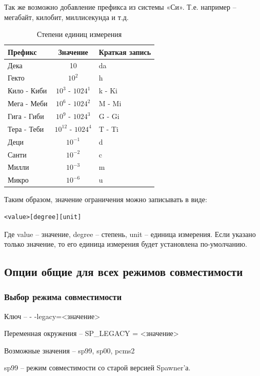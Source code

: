 \documentclass{imcs}
\begin{document}
Так же возможно добавление префикса из системы «Си». Т.е. например – мегабайт, килобит, миллисекунда и т.д.

\begin{table}[h!]
\begin{center}
\begin{tabular}{|l|c|l|}
\hline
Префикс & Значение &  Краткая запись\\
\hline
Дека &  10  & da\\
\hline
Гекто & $10^2$  & h\\
\hline
Кило - Киби & $10^3$ - $1024^1$ & k - Ki\\
\hline
Мега - Меби & $10^6$ - $1024^2$ & M - Mi\\
\hline
Гига - Гиби & $10^9$ - $1024^3$ & G - Gi\\
\hline
Тера - Теби & $10^{12}$ - $1024^4$  & T - Ti\\
\hline
Деци  & $10^{-1}$ & d\\
\hline
Санти & $10^{-2}$ & c\\
\hline
Милли & $10^{-3}$ & m\\
\hline
Микро & $10^{-6}$ & u\\
\hline
\end{tabular}
\caption{Степени единиц измерения}\label{tab:sp_degrees}
\end{center}
\end{table}

Таким образом, значение ограничения можно записывать в виде: 
\begin{lstlisting}
<value>[degree][unit]
\end{lstlisting}
Где value -- значение, degree -- степень, unit -- единица измерения.
Если указано только значение, то его единица измерения будет установлена по-умолчанию.
 
\subsection{Опции общие для всех режимов совместимости}
\subsubsection{Выбор режима совместимости}

Ключ -- - -legacy=<значение>

Переменная окружения -- SP\_LEGACY = <значение>

Возможные значения -- sp99, sp00, pcms2

sp99 -- режим совместимости со старой версией Spawner'а.
 
\end{document}
